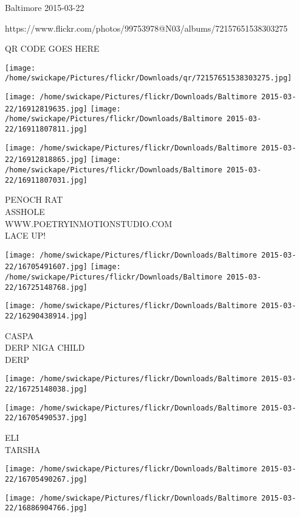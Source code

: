 \documentclass[10pt,letterpaper]{article}
\begin{document}
Baltimore 2015-03-22

https://www.flickr.com/photos/99753978@N03/albums/72157651538303275

QR CODE GOES HERE

\texttt{[image: /home/swickape/Pictures/flickr/Downloads/qr/72157651538303275.jpg]}
\pagebreak

\texttt{[image: /home/swickape/Pictures/flickr/Downloads/Baltimore 2015-03-22/16912819635.jpg]}
\texttt{[image: /home/swickape/Pictures/flickr/Downloads/Baltimore 2015-03-22/16911807811.jpg]}

\texttt{[image: /home/swickape/Pictures/flickr/Downloads/Baltimore 2015-03-22/16912818865.jpg]}
\texttt{[image: /home/swickape/Pictures/flickr/Downloads/Baltimore 2015-03-22/16911807031.jpg]}

PENOCH RAT\\
ASSHOLE\\
WWW.POETRYINMOTIONSTUDIO.COM\\
LACE UP!\\
\pagebreak

\texttt{[image: /home/swickape/Pictures/flickr/Downloads/Baltimore 2015-03-22/16705491607.jpg]}
\texttt{[image: /home/swickape/Pictures/flickr/Downloads/Baltimore 2015-03-22/16725148768.jpg]}

\vspace{0.25in}
\texttt{[image: /home/swickape/Pictures/flickr/Downloads/Baltimore 2015-03-22/16290438914.jpg]}

CASPA\\
DERP NIGA CHILD\\
DERP\\
\pagebreak

\texttt{[image: /home/swickape/Pictures/flickr/Downloads/Baltimore 2015-03-22/16725148038.jpg]}

\vspace{0.25in}
\texttt{[image: /home/swickape/Pictures/flickr/Downloads/Baltimore 2015-03-22/16705490537.jpg]}

ELI\\
TARSHA\\
\pagebreak

\texttt{[image: /home/swickape/Pictures/flickr/Downloads/Baltimore 2015-03-22/16705490267.jpg]}

\vspace{0.25in}
\texttt{[image: /home/swickape/Pictures/flickr/Downloads/Baltimore 2015-03-22/16886904766.jpg]}
\end{document}

